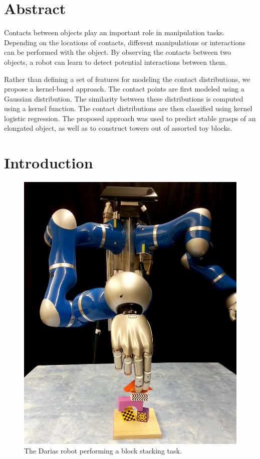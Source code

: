 \section*{Abstract}
Contacts between objects play an important role in manipulation tasks.
Depending on the locations of contacts, different manipulations or
interactions can be performed with the object. By observing the contacts
between two objects, a robot can learn to detect potential interactions
between them. 

Rather than defining a set of features for modeling the contact distributions,
we propose a kernel-based approach. The contact points are first
modeled using a Gaussian distribution. The similarity between these
distributions is computed using a kernel function. The contact distributions
are then classified using kernel logistic regression. The proposed
approach was used to predict stable grasps of an elongated object,
as well as to construct towers out of assorted toy blocks. 

\section{Introduction}

\begin{figure}
	\centering
	\includegraphics[width=.99\linewidth]{oli/PicsforIROS2014/RobotStacking}
	\caption{\label{fig:The-Darias-robot}The Darias robot performing a block stacking
task.}
	\figspace
\end{figure}

